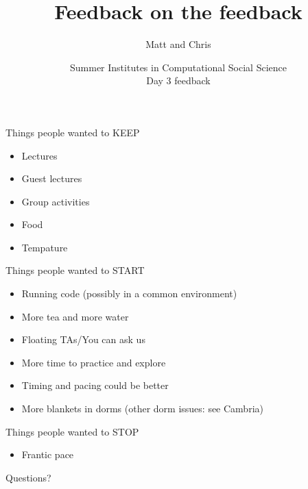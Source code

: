 \documentclass{beamer}
\title[]{Feedback on the feedback}
\author[]{Matt and Chris}
\date[]{Summer Institutes in Computational Social Science\\Day 3 feedback
}
\begin{document}
\frame{\titlepage}
\begin{frame}

Things people wanted to KEEP
\begin{itemize}
\item Lectures
\item Guest lectures
\item Group activities
\item Food
\item Tempature
\end{itemize}

\end{frame}
\begin{frame}

Things people wanted to START
\begin{itemize}
\item Running code (possibly in a common environment)
\pause
\item More tea and more water
\pause
\item Floating TAs/You can ask us
\pause
\item More time to practice and explore
\pause
\item Timing and pacing could be better
\pause
\item More blankets in dorms (other dorm issues: see Cambria)
\end{itemize}

\end{frame}
\begin{frame}

Things people wanted to STOP
\begin{itemize}
\item Frantic pace
\end{itemize}

\end{frame}
\begin{frame}

\begin{center}
\LARGE
Questions?
\end{center}

\end{frame}
\end{document}
